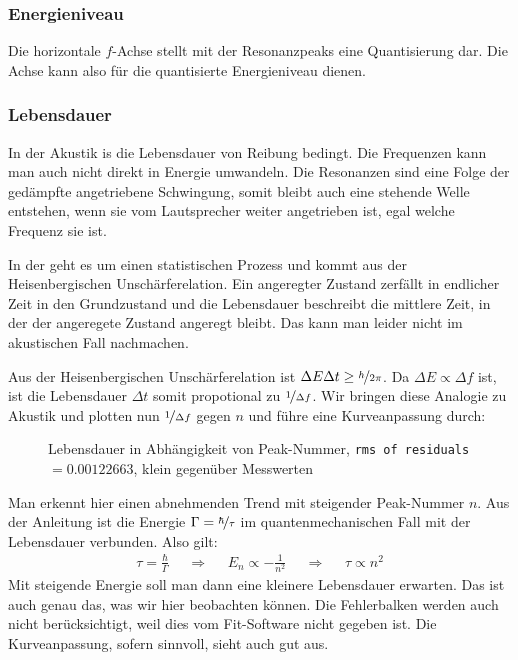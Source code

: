 		\subsubsection{Energieniveau}
			Die horizontale $f$-Achse stellt mit der Resonanzpeaks eine Quantisierung dar. Die Achse kann also für die quantisierte Energieniveau dienen.

		\subsubsection{Lebensdauer}
			In der Akustik is die Lebensdauer von Reibung bedingt. Die Frequenzen kann man auch nicht direkt in Energie umwandeln. Die Resonanzen sind eine Folge der gedämpfte angetriebene Schwingung, somit bleibt auch eine stehende Welle entstehen, wenn sie vom Lautsprecher weiter angetrieben ist, egal welche Frequenz sie ist. 

			In der \qm{} geht es um einen statistischen Prozess und kommt aus der Heisenbergischen Unschärferelation. Ein angeregter Zustand zerfällt in endlicher Zeit in den Grundzustand und die Lebensdauer beschreibt die mittlere Zeit, in der der angeregete Zustand angeregt bleibt. Das kann man leider nicht im akustischen Fall nachmachen.

			Aus der Heisenbergischen Unschärferelation ist $\Delta E \Delta t \geq \nicefrac{h}{2\pi}$. Da $\Delta E \propto \Delta f$ ist, ist die Lebensdauer $\Delta t$ somit propotional zu $\nicefrac{1}{\Delta f}$. Wir bringen diese Analogie zu Akustik und plotten nun $\nicefrac{1}{\Delta f}$ gegen $n$ und führe eine Kurveanpassung durch:
			\begin{figure}[!ht]
			    \centering
			    \vspace{-1em}
			    \resizebox{.9\textwidth}{!}{}
			    \caption{Lebensdauer in Abhängigkeit von Peak-Nummer, \texttt{rms of residuals} $=\num{0.00122663}$, klein gegenüber Messwerten}
			    \label{fig:tv1-2}
			    \vspace{-1em}
			\end{figure}
			
			Man erkennt hier einen abnehmenden Trend mit steigender Peak-Nummer $n$. Aus der Anleitung ist die Energie $\Gamma = \nicefrac{\hbar}{\tau}$ im quantenmechanischen Fall mit der Lebensdauer verbunden. Also gilt:
			\begin{align}
				\tau = \frac{\hbar}{\Gamma} &&\Rightarrow&& E_n \propto -\frac{1}{n^2} &&\Rightarrow&& \tau \propto n^2
			\end{align}
			Mit steigende Energie soll man dann eine kleinere Lebensdauer erwarten. Das ist auch genau das, was wir hier beobachten können. Die Fehlerbalken werden auch nicht berücksichtigt, weil dies vom Fit-Software nicht gegeben ist. Die Kurveanpassung, sofern sinnvoll, sieht auch gut aus. 

